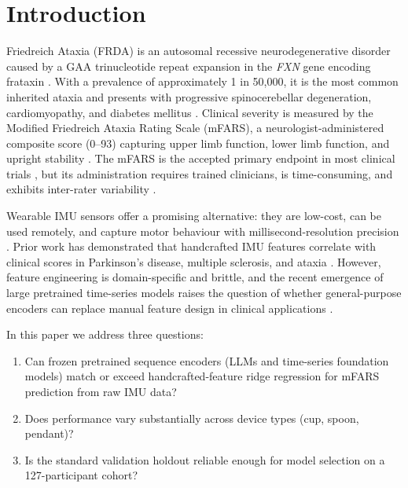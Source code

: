 \documentclass[10pt,twocolumn]{IEEEtran}
\begin{document}
\section{Introduction}

Friedreich Ataxia (FRDA) is an autosomal recessive neurodegenerative
disorder caused by a GAA trinucleotide repeat expansion in the
\textit{FXN} gene encoding frataxin
\cite{Campuzano1996,Koeppen2011,Pandolfo2009}.
With a prevalence of approximately 1 in 50{,}000, it is the most common
inherited ataxia and presents with progressive spinocerebellar degeneration,
cardiomyopathy, and diabetes mellitus \cite{Delatycki2000}.
Clinical severity is measured by the Modified Friedreich Ataxia Rating Scale
(mFARS), a neurologist-administered composite score (0--93) capturing
upper limb function, lower limb function, and upright stability
\cite{Subramony2005,Lynch2006}.
The mFARS is the accepted primary endpoint in most clinical trials
\cite{Reetz2021,Tai2023}, but its administration requires trained clinicians,
is time-consuming, and exhibits inter-rater variability
\cite{Schmitz-Hubsch2006}.

Wearable IMU sensors offer a promising alternative: they are low-cost,
can be used remotely, and capture motor behaviour with millisecond-resolution
precision \cite{Shah2020,Nguyen2021AIM,Guo2023IMU}.
Prior work has demonstrated that handcrafted IMU features
correlate with clinical scores in Parkinson's disease, multiple sclerosis,
and ataxia \cite{Mancini2021,Lonini2022,Milne2017,Carignan2020}.
However, feature engineering is domain-specific and brittle, and the
recent emergence of large pretrained time-series models raises the
question of whether general-purpose encoders can replace manual
feature design in clinical applications \cite{Goswami2024MOMENT,Jin2024TimeLLM,Zhou2023OneForAll}.

In this paper we address three questions:
\begin{enumerate}
  \item Can frozen pretrained sequence encoders (LLMs and time-series foundation
    models) match or exceed handcrafted-feature ridge regression for
    mFARS prediction from raw IMU data?
  \item Does performance vary substantially across device types
    (cup, spoon, pendant)?
  \item Is the standard validation holdout reliable enough for model
    selection on a 127-participant cohort?
\end{enumerate}
\end{document}
